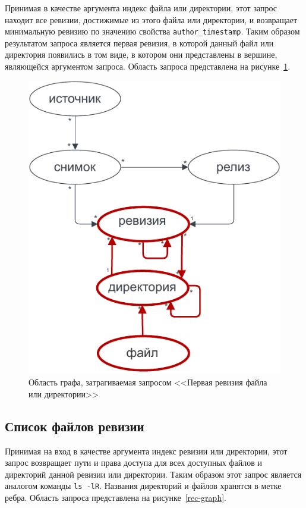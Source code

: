 \documentclass[times,specification,annotation]{itmo-student-thesis}
\begin{document}
Принимая в качестве аргумента индекс файла или директории, этот запрос находит все ревизии, достижимые из этого файла или директории, и возвращает минимальную ревизию по значению свойства \texttt{author\_timestamp}. Таким образом результатом запроса является первая ревизия, в которой данный файл или директория появились в том виде, в котором они представлены в вершине, являющейся аргументом запроса. Область запроса представлена на рисунке~\ref{ecr-graph}.

\begin{figure}[!h]
\caption{Область графа, затрагиваемая запросом <<Первая ревизия файла или директории>>}\label{ecr-graph}
\centering
\includegraphics{img/ecr-graph.pdf}
\end{figure}

\subsection{Список файлов ревизии}

Принимая на вход в качестве аргумента индекс ревизии или директории, этот запрос возвращает пути и права доступа для всех доступных файлов и директорий данной ревизии или директории. Таким образом этот запрос является аналогом команды \texttt{ls -lR}. Названия директорий и файлов хранятся в метке ребра. Область запроса представлена на рисунке~\ref{rec-graph}.
\end{document}
